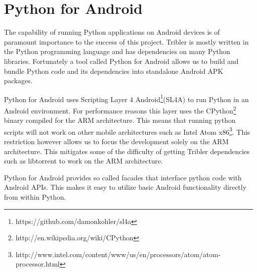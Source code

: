 \section{Python for Android}
	\label{scc:p4a}
	The capability of running Python applications on Android devices is of paramount importance to the success of this project. Tribler is mostly written in the Python programming language and has dependencies on many Python libraries. Fortunately a tool called Python for Android allows us to build and bundle Python code and its dependencies into standalone Android APK packages.

	Python for Android uses Scripting Layer 4 Android\footnote{https://github.com/damonkohler/sl4a}(SL4A) to run Python in an Android environment. For performance reasons this layer uses the CPython\footnote{http://en.wikipedia.org/wiki/CPython} binary compiled for the ARM architecture. This means that running python scripts will not work on other mobile architectures such as Intel Atom x86\footnote{http://www.intel.com/content/www/us/en/processors/atom/atom-processor.html}. This restriction however allows us to focus the development solely on the ARM architecture. This mitigates some of the difficulty of getting Tribler dependencies such as libtorrent to work on the ARM architecture.

	Python for Android provides so called facades that interface python code with Android APIs. This makes it easy to utilize basic Android functionality directly from within Python.
